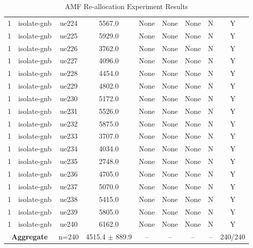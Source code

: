 \begin{table}[ht]
\begin{tabular}{|c|c|c|c|c|c|c|c|c|}
1 & isolate-gnb & ue224 & 5567.0 & None & None & None & N & Y \\
1 & isolate-gnb & ue225 & 5929.0 & None & None & None & N & Y \\
1 & isolate-gnb & ue226 & 3762.0 & None & None & None & N & Y \\
1 & isolate-gnb & ue227 & 4096.0 & None & None & None & N & Y \\
1 & isolate-gnb & ue228 & 4454.0 & None & None & None & N & Y \\
1 & isolate-gnb & ue229 & 4802.0 & None & None & None & N & Y \\
1 & isolate-gnb & ue230 & 5172.0 & None & None & None & N & Y \\
1 & isolate-gnb & ue231 & 5526.0 & None & None & None & N & Y \\
1 & isolate-gnb & ue232 & 5875.0 & None & None & None & N & Y \\
1 & isolate-gnb & ue233 & 3707.0 & None & None & None & N & Y \\
1 & isolate-gnb & ue234 & 4034.0 & None & None & None & N & Y \\
1 & isolate-gnb & ue235 & 2748.0 & None & None & None & N & Y \\
1 & isolate-gnb & ue236 & 4705.0 & None & None & None & N & Y \\
1 & isolate-gnb & ue237 & 5070.0 & None & None & None & N & Y \\
1 & isolate-gnb & ue238 & 5415.0 & None & None & None & N & Y \\
1 & isolate-gnb & ue239 & 5805.0 & None & None & None & N & Y \\
1 & isolate-gnb & ue240 & 6162.0 & None & None & None & N & Y \\
\multicolumn{2}{|c|}{\textbf{Aggregate}} & n=240 & 4515.4 $\pm$ 889.9 & -- & -- & -- & -- & 240/240 \\
\hline
\end{tabular}
\caption{AMF Re-allocation Experiment Results}
\label{tab:amf_realloc}
\end{table}
